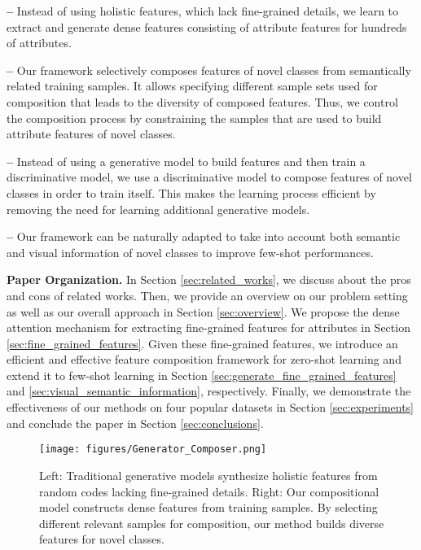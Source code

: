\documentclass[10pt,journal,compsoc]{IEEEtran}
\newcommand{\1}{\boldsymbol{1}}
\newcommand{\0}{\boldsymbol{0}}
\newcommand{\<}{\langle}
\renewcommand{\>}{\rangle}
\newcommand{\myparagraph}[1]{\vspace{-2pt}\medskip\noindent\textbf{#1}}
\begin{document}
\smallskip\noindent\textbf{--} Instead of using holistic features, which lack fine-grained details, we learn to extract and generate dense features consisting of attribute features for hundreds of attributes. 

\smallskip\noindent\textbf{--} Our framework selectively composes features of novel classes from semantically related training samples. It allows specifying different sample sets used for composition that leads to the diversity of composed features. Thus, we control the composition process by constraining the samples that are used to build attribute features of novel classes.

\smallskip\noindent\textbf{--}  Instead of using a generative model to build features and then train a discriminative model, we use a discriminative model to compose features of novel classes in order to train itself. This makes the learning process efficient by removing the need for learning additional generative models.

\smallskip\noindent\textbf{--} Our framework can be naturally adapted to take into account both semantic and visual information of novel classes to improve few-shot performances.

\myparagraph{Paper Organization.}
In Section \ref{sec:related_works}, we discuss about the pros and cons of related works.
Then, we provide an overview on our problem setting as well as our overall approach in Section \ref{sec:overview}.
We propose the dense attention mechanism for extracting fine-grained features for attributes in Section \ref{sec:fine_grained_features}. 
Given these fine-grained features, we introduce an efficient and effective feature composition framework for zero-shot learning and extend it to few-shot learning in Section \ref{sec:generate_fine_grained_features} and \ref{sec:visual_semantic_information}, respectively.
Finally, we demonstrate the effectiveness of our methods on four popular datasets in Section \ref{sec:experiments} and conclude the paper in Section \ref{sec:conclusions}.

\begin{figure*} 
\centering
  \texttt{[image: figures/Generator\_Composer.png]}
  \vspace{0mm}
\caption{\small{Left: Traditional generative models synthesize holistic features from random codes lacking fine-grained details. Right: Our compositional model constructs dense features from training samples. By selecting different relevant samples for composition, our method builds diverse features for novel classes.}}
\label{fig:motivation}
\end{figure*}
\end{document}
